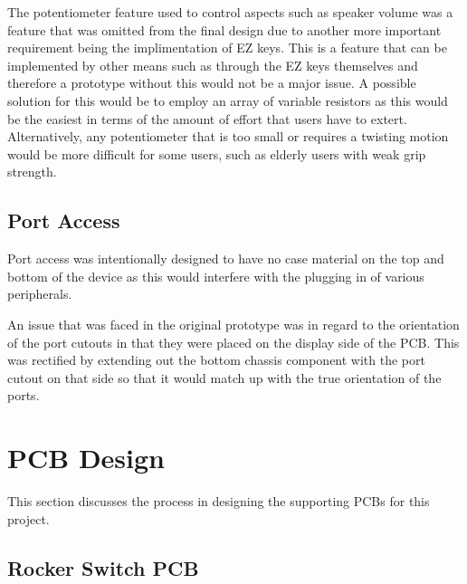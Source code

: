 The potentiometer feature used to control aspects such as speaker volume was a feature that was omitted from the final design due to another more important requirement being the implimentation of EZ keys.
This is a feature that can be implemented by other means such as through the EZ keys themselves and therefore a prototype without this would not be a major issue.
A possible solution for this would be to employ an array of variable resistors as this would be the easiest in terms of the amount of effort that users have to extert.
Alternatively, any potentiometer that is too small or requires a twisting motion would be more difficult for some users, such as elderly users with weak grip strength.

\subsection{Port Access}

Port access was intentionally designed to have no case material on the top and bottom of the device as this would interfere with the plugging in of various peripherals.

An issue that was faced in the original prototype was in regard to the orientation of the port cutouts in that they were placed on the display side of the PCB.
This was rectified by extending out the bottom chassis component with the port cutout on that side so that it would match up with the true orientation of the ports. %


\section{PCB Design}
This section discusses the process in designing the supporting PCBs for this project.


\subsection{Rocker Switch PCB}

